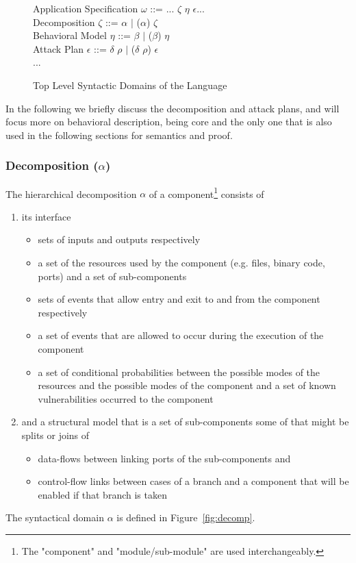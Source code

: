 \documentclass[conference]{IEEEtran}
\begin{document}
\begin{figure}[ht]
\centering
Application Specification \hspace*{0.9cm} $\omega$ ::= ... $\zeta$ $\eta$ $\epsilon$...
\\\hspace*{-0.1cm} Decomposition \hspace*{2.2cm} $\zeta$ ::= $\alpha$ $|$ ($\alpha$) $\zeta$
\\Behavioral Model \hspace*{1.8cm} $\eta$ ::= $\beta$ $|$ ($\beta$) $\eta$
\\\hspace*{0.3cm} Attack Plan \hspace*{2.6cm} $\epsilon$ ::= $\delta$ $\rho$  $|$ ($\delta$ $\rho$) $\epsilon$\\
\hspace*{2.8cm}...
\caption{Top Level Syntactic Domains of the Language}
\label{fig:domains}
\end{figure}

In the following we briefly discuss the decomposition and attack plans, and will focus more on behavioral description, being core and the only one that is also used in the following sections for semantics and proof.
\subsubsection*{Decomposition ($\alpha$)}
The hierarchical decomposition $\alpha$ of a component\footnote{The "component" and "module/sub-module" are used interchangeably.} consists of 
\begin{enumerate}
\item its interface
\begin{itemize}
\item sets of inputs and outputs respectively
\item a set of the resources used by the component (e.g. files, binary code, ports) and a set of sub-components
\item sets of events that allow entry and exit to and from the component respectively
\item a set of events that are allowed to occur during the execution of the component
\item a set of conditional probabilities between the possible modes of the resources and the possible modes of the component and
a set of known vulnerabilities occurred to the component
\end{itemize}
\item and a structural model that is a set of sub-components some of that might be splits or joins of
\begin{itemize}
\item data-flows between linking ports of the sub-components and
\item control-flow links between cases of a branch and a component that will be enabled if that branch is taken
\end{itemize}
\end{enumerate}
The syntactical domain $\alpha$ is defined in Figure~\ref{fig:decomp}.
\end{document}
